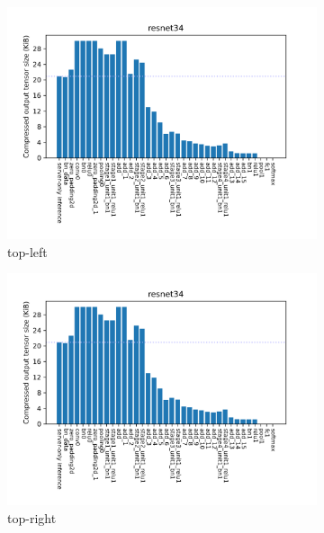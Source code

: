 \begin{figure}[htb]
  \centering
  \begin{subfigure}{.5\linewidth}
    \centering
    \includegraphics[width=\linewidth]{img/sample.png}
    \caption{top-left}
  \end{subfigure}%
  \begin{subfigure}{.5\linewidth}
    \centering
    \includegraphics[width=\linewidth]{img/sample.png}
    \caption{top-right}
  \end{subfigure}
  \begin{subfigure}{.5\linewidth}
    \centering

\end{subfigure}
\end{figure}
